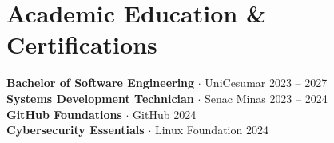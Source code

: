 \documentclass[a4paper,11pt]{article}
\begin{document}
\section{Academic Education \& Certifications}
\textbf{Bachelor of Software Engineering} $\cdot$ UniCesumar
\hfill 2023 -- 2027 \\
\textbf{Systems Development Technician} $\cdot$ Senac Minas
\hfill 2023 -- 2024 \\
\textbf{GitHub Foundations} $\cdot$ GitHub \hfill 2024 \\
\textbf{Cybersecurity Essentials} $\cdot$ Linux Foundation \hfill 2024

\end{document}

